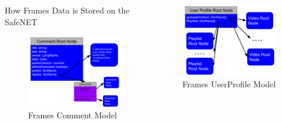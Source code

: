 \documentclass[final]{beamer}
\newlength{\onecolwid}
\newlength{\twocolwid}
\begin{document}
\begin{frame}[t]
\begin{columns}[t]
\begin{column}{\twocolwid}
\begin{columns}[t,totalwidth=\twocolwid]
\begin{column}{\onecolwid}
\begin{block}{How Frames Data is Stored on the SafeNET}
  \begin{figure}
  \includegraphics[width=0.8\linewidth]{comment-model.png}
  \caption{Frames Comment Model}
  \label{fig:comment-model}
  \end{figure}

\end{block}


\end{column} %

\begin{column}{\onecolwid}\vspace{-.6in} %


\begin{block}{}

  \begin{figure}
  \includegraphics[width=0.8\linewidth]{user-profile-model.png}
  \caption{Frames UserProfile Model}
  \label{fig:user-profile-model}
  \end{figure}


\end{block}
\end{column}
\end{columns}
\end{column}
\end{columns}
\end{frame}
\end{document}
